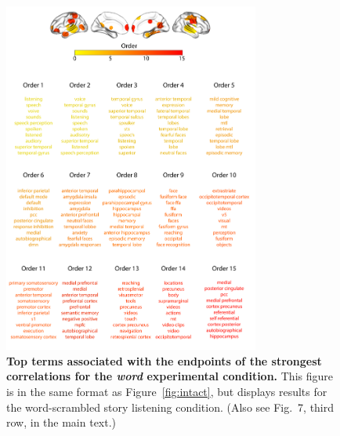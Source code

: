 \documentclass{article}
\newcommand{\neurosynth}{7}
\begin{document}
\begin{figure}[p!]
\centering
\includegraphics[width=0.75\textwidth]{figs/supp_15_word}
\caption{\textbf{Top terms associated with the endpoints of the
    strongest correlations for the \textit{word} experimental
    condition.}  This figure is in the same format as
  Figure~\ref{fig:intact}, but displays results for the
  word-scrambled story listening condition.  (Also see Fig.~\neurosynth,
third row, in the main text.)}
\label{fig:word}
\end{figure}
\end{document}
